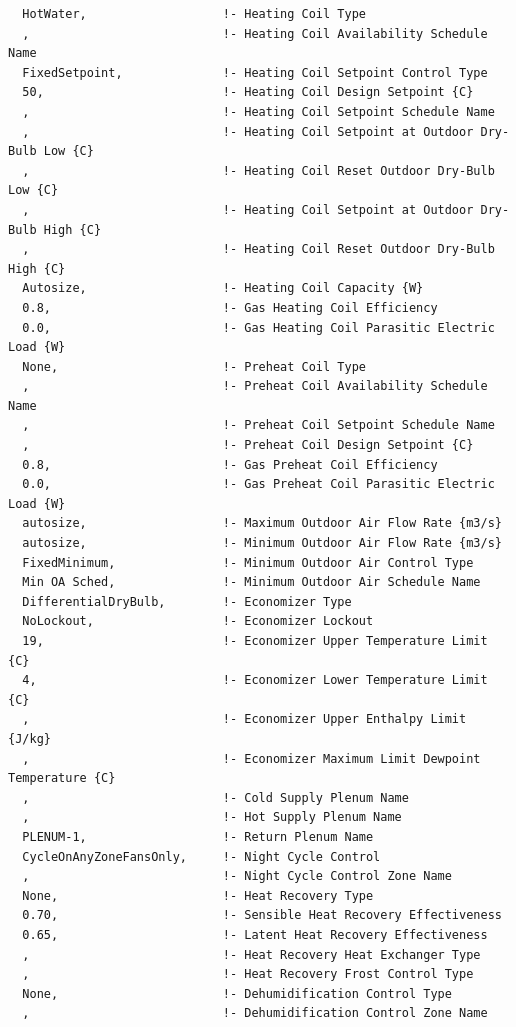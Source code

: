 \begin{lstlisting}
  HotWater,                   !- Heating Coil Type
  ,                           !- Heating Coil Availability Schedule Name
  FixedSetpoint,              !- Heating Coil Setpoint Control Type
  50,                         !- Heating Coil Design Setpoint {C}
  ,                           !- Heating Coil Setpoint Schedule Name
  ,                           !- Heating Coil Setpoint at Outdoor Dry-Bulb Low {C}
  ,                           !- Heating Coil Reset Outdoor Dry-Bulb Low {C}
  ,                           !- Heating Coil Setpoint at Outdoor Dry-Bulb High {C}
  ,                           !- Heating Coil Reset Outdoor Dry-Bulb High {C}
  Autosize,                   !- Heating Coil Capacity {W}
  0.8,                        !- Gas Heating Coil Efficiency
  0.0,                        !- Gas Heating Coil Parasitic Electric Load {W}
  None,                       !- Preheat Coil Type
  ,                           !- Preheat Coil Availability Schedule Name
  ,                           !- Preheat Coil Setpoint Schedule Name
  ,                           !- Preheat Coil Design Setpoint {C}
  0.8,                        !- Gas Preheat Coil Efficiency
  0.0,                        !- Gas Preheat Coil Parasitic Electric Load {W}
  autosize,                   !- Maximum Outdoor Air Flow Rate {m3/s}
  autosize,                   !- Minimum Outdoor Air Flow Rate {m3/s}
  FixedMinimum,               !- Minimum Outdoor Air Control Type
  Min OA Sched,               !- Minimum Outdoor Air Schedule Name
  DifferentialDryBulb,        !- Economizer Type
  NoLockout,                  !- Economizer Lockout
  19,                         !- Economizer Upper Temperature Limit {C}
  4,                          !- Economizer Lower Temperature Limit {C}
  ,                           !- Economizer Upper Enthalpy Limit {J/kg}
  ,                           !- Economizer Maximum Limit Dewpoint Temperature {C}
  ,                           !- Cold Supply Plenum Name
  ,                           !- Hot Supply Plenum Name
  PLENUM-1,                   !- Return Plenum Name
  CycleOnAnyZoneFansOnly,     !- Night Cycle Control
  ,                           !- Night Cycle Control Zone Name
  None,                       !- Heat Recovery Type
  0.70,                       !- Sensible Heat Recovery Effectiveness
  0.65,                       !- Latent Heat Recovery Effectiveness
  ,                           !- Heat Recovery Heat Exchanger Type
  ,                           !- Heat Recovery Frost Control Type
  None,                       !- Dehumidification Control Type
  ,                           !- Dehumidification Control Zone Name

\end{lstlisting}

